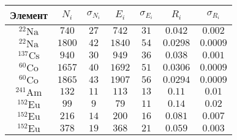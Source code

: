 \begin{tabular}{| c | c | c | c | c | c | c |}
\hline
Элемент & $N_i$ & $\sigma_{N_i}$ & $E_i$ & $\sigma_{E_i}$ & $R_i$ & $\sigma_{R_i}$\\
\hline
$^{22}\text{Na}$ & $740$ & $27$ & $742$ & $31$ & $0.042$ & $0.002$\\
\hline
$^{22}\text{Na}$ & $1800$ & $42$ & $1840$ & $54$ & $0.0298$ & $0.0009$\\
\hline
$^{137}\text{Cs}$ & $940$ & $30$ & $949$ & $36$ & $0.038$ & $0.001$\\
\hline
$^{60}\text{Co}$ & $1657$ & $40$ & $1692$ & $51$ & $0.0306$ & $0.0009$\\
\hline
$^{60}\text{Co}$ & $1865$ & $43$ & $1907$ & $56$ & $0.0294$ & $0.0009$\\
\hline
$^{241}\text{Am}$ & $132$ & $11$ & $113$ & $13$ & $0.11$ & $0.01$\\
\hline
$^{152}\text{Eu}$ & $99$ & $9$ & $79$ & $11$ & $0.14$ & $0.02$\\
\hline
$^{152}\text{Eu}$ & $216$ & $14$ & $200$ & $16$ & $0.081$ & $0.007$\\
\hline
$^{152}\text{Eu}$ & $378$ & $19$ & $368$ & $21$ & $0.059$ & $0.003$\\
\hline
\end{tabular}

